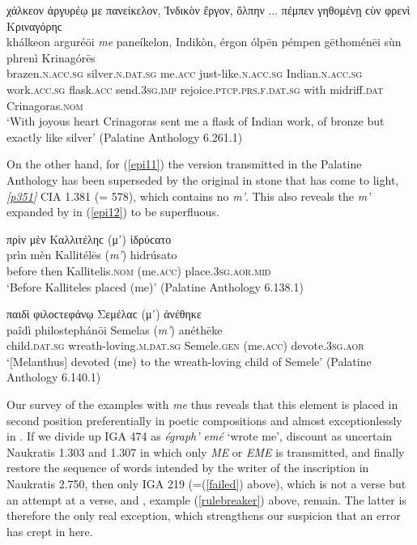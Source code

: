 \begin{exe}
\ex χάλκεον ἀργυρέῳ {με} πανείκελον, Ἰνδικὸν ἔργον, ὄλπην ... πέμπεν γηθομένῃ ϲὺν φρενὶ Κριναγόρηϲ\\
\gll khálkeon arguréōi \emph{me} paneíkelon, Indikòn, érgon ólpēn pémpen gēthoménēi sùn phrenì Krinagórēs\\
brazen.\textsc{n.acc.sg} silver.\textsc{n.dat.sg} me.\textsc{acc} just-like.\textsc{n.acc.sg} Indian.\textsc{n.acc.sg} work.\textsc{acc.sg} flask.\textsc{acc} send.\textsc{3sg.imp} rejoice.\textsc{ptcp.prs.f.dat.sg} with midriff.\textsc{dat} Crinagoras.\textsc{nom}\\
\trans `With joyous heart Crinagoras sent me a flask of Indian work, of bronze but exactly like silver' (Palatine Anthology 6.261.1)
\label{epi10}
\end{exe}

On the other hand, for (\ref{epi11}) the version transmitted in the Palatine Anthology has been superseded by the original in stone that has come to light, \hyperlink{p351}{\emph{[p351]}} CIA 1.381 (=\citet{Kaibel1878} 578), which contains no \textit{m'}. This also reveals the \textit{m'} expanded by \citet[147]{Hecker1852} in (\ref{epi12}) to be superfluous.

\begin{exe}
\ex πρὶν μὲν Καλλιτέληϲ (μ᾽) ἱδρύϲατο\\
\gll prìn mèn Kallitélēs (\emph{m'}) hidrúsato\\
before then Kallitelis.\textsc{nom} (me.\textsc{acc}) place.\textsc{3sg.aor.mid}\\
\trans `Before Kalliteles placed (me)' (Palatine Anthology 6.138.1)
\label{epi11}
\end{exe}

\begin{exe}
\ex παιδὶ φιλοϲτεφάνῳ Σεμέλαϲ (μ᾽) ἀνέθηκε\\
\gll paîdì philostephánōi Semelas (\emph{m'}) anéthēke\\
child.\textsc{dat.sg} wreath-loving.\textsc{m.dat.sg} Semele.\textsc{gen} (me.\textsc{acc}) devote.\textsc{3sg.aor}\\
\trans `{[}Melanthus{]} devoted (me) to the wreath-loving child of Semele' (Palatine Anthology 6.140.1)
\label{epi12}
\end{exe}

Our survey of the examples with \textit{me} thus reveals that this element is placed in second position preferentially in poetic compositions and almost exceptionlessly in . If we divide up IGA 474 as \textit{égraph' emé} `wrote me', discount as uncertain Naukratis 1.303 and 1.307 in which only \textit{ME} or \textit{EME} is transmitted, and finally restore the sequence of words intended by the writer of the inscription in Naukratis 2.750, then only IGA 219 (=(\ref{failed}) above), which is not a verse but an attempt at a verse, and \citet[51]{Klein1887}, example (\ref{rulebreaker}) above, remain. The latter is therefore the only real exception, which strengthens our suspicion that an error has crept in here.

